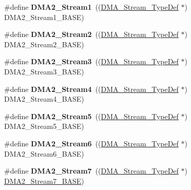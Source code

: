 \begin{DoxyCompactItemize}
\item 
\mbox{\label{group___peripheral__declaration_gae96f15d34d3c41c16fce69bc2878151a}} 
\#define {\bfseries D\+M\+A2\+\_\+\+Stream1}~((\hyperlink{struct_d_m_a___stream___type_def}{D\+M\+A\+\_\+\+Stream\+\_\+\+Type\+Def} $\ast$) D\+M\+A2\+\_\+\+Stream1\+\_\+\+B\+A\+SE)
\item 
\mbox{\label{group___peripheral__declaration_ga71bb410664b861ff0520f08976e24ee1}} 
\#define {\bfseries D\+M\+A2\+\_\+\+Stream2}~((\hyperlink{struct_d_m_a___stream___type_def}{D\+M\+A\+\_\+\+Stream\+\_\+\+Type\+Def} $\ast$) D\+M\+A2\+\_\+\+Stream2\+\_\+\+B\+A\+SE)
\item 
\mbox{\label{group___peripheral__declaration_gaa6ead6a5ca6b8df70b5505aaeec6fd2e}} 
\#define {\bfseries D\+M\+A2\+\_\+\+Stream3}~((\hyperlink{struct_d_m_a___stream___type_def}{D\+M\+A\+\_\+\+Stream\+\_\+\+Type\+Def} $\ast$) D\+M\+A2\+\_\+\+Stream3\+\_\+\+B\+A\+SE)
\item 
\mbox{\label{group___peripheral__declaration_gae32674772021620800275dd3b6d62c2f}} 
\#define {\bfseries D\+M\+A2\+\_\+\+Stream4}~((\hyperlink{struct_d_m_a___stream___type_def}{D\+M\+A\+\_\+\+Stream\+\_\+\+Type\+Def} $\ast$) D\+M\+A2\+\_\+\+Stream4\+\_\+\+B\+A\+SE)
\item 
\mbox{\label{group___peripheral__declaration_gac40f58718761251875b5a897287efd83}} 
\#define {\bfseries D\+M\+A2\+\_\+\+Stream5}~((\hyperlink{struct_d_m_a___stream___type_def}{D\+M\+A\+\_\+\+Stream\+\_\+\+Type\+Def} $\ast$) D\+M\+A2\+\_\+\+Stream5\+\_\+\+B\+A\+SE)
\item 
\mbox{\label{group___peripheral__declaration_ga11a00b283e0911cd427e277e5a314ccc}} 
\#define {\bfseries D\+M\+A2\+\_\+\+Stream6}~((\hyperlink{struct_d_m_a___stream___type_def}{D\+M\+A\+\_\+\+Stream\+\_\+\+Type\+Def} $\ast$) D\+M\+A2\+\_\+\+Stream6\+\_\+\+B\+A\+SE)
\item 
\mbox{\label{group___peripheral__declaration_gacc135dbca0eca67d5aa0abc555f053ce}} 
\#define {\bfseries D\+M\+A2\+\_\+\+Stream7}~((\hyperlink{struct_d_m_a___stream___type_def}{D\+M\+A\+\_\+\+Stream\+\_\+\+Type\+Def} $\ast$) \hyperlink{group___peripheral__memory__map_gaa9faa708ad2440d24eb1064cba9bb06d}{D\+M\+A2\+\_\+\+Stream7\+\_\+\+B\+A\+SE})

\end{DoxyCompactItemize}
